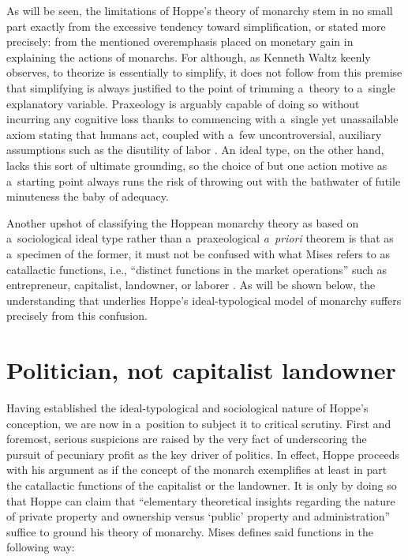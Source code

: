 As will be seen, the limitations of Hoppe's theory of monarchy stem in no small part exactly from the excessive tendency toward simplification, or stated more precisely: from the mentioned overemphasis placed on monetary gain in explaining the actions of monarchs. For although, as Kenneth Waltz 
\parencite*[][chap. 1]{waltz_theory_1979} %
 keenly observes, to theorize is essentially to simplify, it does not follow from this premise that simplifying is always justified to the point of trimming a~theory to a~single explanatory variable. Praxeology is arguably capable of doing so without incurring any cognitive loss thanks to commencing with a~single yet unassailable axiom stating that humans act, coupled with a~few uncontroversial, auxiliary assumptions such as the disutility of labor 
\parencite[][chap. 1]{rothbard_man_2009}. %
 An ideal type, on the other hand, lacks this sort of ultimate grounding, so the choice of but one action motive as a~starting point always runs the risk of throwing out with the bathwater of futile minuteness the baby of adequacy.



Another upshot of classifying the Hoppean monarchy theory as based on a~sociological ideal type rather than a~praxeological \textit{a~priori} theorem is that as a~specimen of the former, it must not be confused with what Mises refers to as catallactic functions, i.e., ``distinct functions in the market operations'' such as entrepreneur, capitalist, landowner, or laborer 
\parencite[][p.252]{mises_human_1998}. %
 As will be shown below, the understanding that underlies Hoppe's ideal-typological model of monarchy suffers precisely from this confusion.



\section{Politician, not capitalist landowner}

Having established the ideal-typological and sociological nature of Hoppe's conception, we are now in a~position to subject it to critical scrutiny. First and foremost, serious suspicions are raised by the very fact of underscoring the pursuit of pecuniary profit as the key driver of politics. In effect, Hoppe proceeds with his argument as if the concept of the monarch exemplifies at least in part the catallactic functions of the\textcolor[rgb]{1.0,0.2,0.2}{ }capitalist or the landowner. It is only by doing so that Hoppe can claim that ``elementary theoretical insights regarding the nature of private property and ownership versus ‘public' property and administration'' suffice to ground his theory of monarchy. Mises 
\parencite*[][p.255]{mises_human_1998} %
 defines said functions in the following way:



